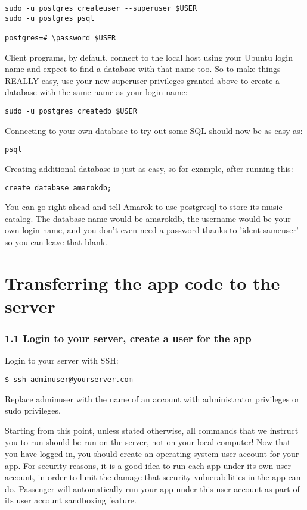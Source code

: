 \documentclass[11pt]{article}
\begin{document}
\begin{verbatim}
sudo -u postgres createuser --superuser $USER
sudo -u postgres psql

postgres=# \password $USER
\end{verbatim}

Client programs, by default, connect to the local host using your Ubuntu login name and expect to find a database with that name too. So to make things REALLY easy, use your new superuser privileges granted above to create a database with the same name as your login name:

\begin{verbatim}
sudo -u postgres createdb $USER
\end{verbatim}

Connecting to your own database to try out some SQL should now be as easy as:

\begin{verbatim}
psql
\end{verbatim}
Creating additional database is just as easy, so for example, after running this:

\begin{verbatim}
create database amarokdb;
\end{verbatim}

You can go right ahead and tell Amarok to use postgresql to store its music catalog. The database name would be amarokdb, the username would be your own login name, and you don't even need a password thanks to 'ident sameuser' so you can leave that blank. 

\section{Transferring the app code to the server}
\label{sec:org7c7d0dc}

\subsubsection{1.1 Login to your server, create a user for the app}
\label{sec:org8210f0d}

Login to your server with SSH:
\begin{verbatim}
$ ssh adminuser@yourserver.com
\end{verbatim}

Replace adminuser with the name of an account with administrator privileges or sudo privileges.

Starting from this point, unless stated otherwise, all commands that we instruct you to run should be run on the server, not on your local computer!
Now that you have logged in, you should create an operating system user account for your app. For security reasons, it is a good idea to run each app under its own user account, in order to limit the damage that security vulnerabilities in the app can do. Passenger will automatically run your app under this user account as part of its user account sandboxing feature.
\end{document}

